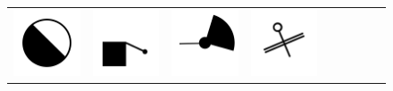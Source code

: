 \documentclass[doc]{apa6}
\newcommand{\stimulusscale}{.1}
\begin{document}
\begin{figure}[t]
\begin{center}
\begin{tabular}{c|cccccccc}
\includegraphics[scale=\stimulusscale]{./set21stim75.png} &
\includegraphics[scale=\stimulusscale]{./set22stim75.png} &
\includegraphics[scale=\stimulusscale]{./set23stim75.png} &
\includegraphics[scale=\stimulusscale]{./set24stim75.png} &

\end{tabular}
\end{center}
\end{figure}
\end{document}
